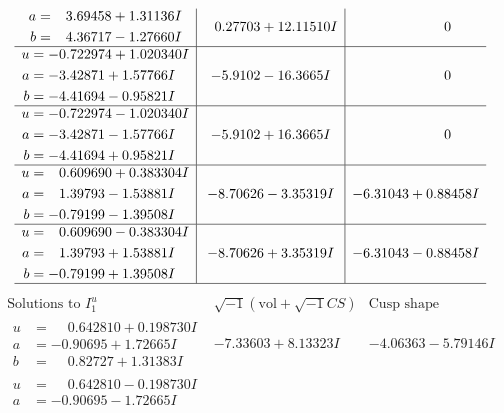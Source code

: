 \documentclass[1p]{elsarticle_modified}
\theoremstyle{definition}
\newcommand{\I}{\sqrt{-1}}
\begin{document}
$$\begin{array}{c|c|c}
\begin{aligned}
a &= \phantom{-}3.69458 + 1.31136 I \\
b &= \phantom{-}4.36717 - 1.27660 I\end{aligned}
 & \phantom{-}0.27703 + 12.11510 I & \phantom{-0.000000 } 0 \\ \hline\begin{aligned}
u &= -0.722974 + 1.020340 I \\
a &= -3.42871 + 1.57766 I \\
b &= -4.41694 - 0.95821 I\end{aligned}
 & -5.9102 - 16.3665 I & \phantom{-0.000000 } 0 \\ \hline\begin{aligned}
u &= -0.722974 - 1.020340 I \\
a &= -3.42871 - 1.57766 I \\
b &= -4.41694 + 0.95821 I\end{aligned}
 & -5.9102 + 16.3665 I & \phantom{-0.000000 } 0 \\ \hline\begin{aligned}
u &= \phantom{-}0.609690 + 0.383304 I \\
a &= \phantom{-}1.39793 - 1.53881 I \\
b &= -0.79199 - 1.39508 I\end{aligned}
 & -8.70626 - 3.35319 I & -6.31043 + 0.88458 I \\ \hline\begin{aligned}
u &= \phantom{-}0.609690 - 0.383304 I \\
a &= \phantom{-}1.39793 + 1.53881 I \\
b &= -0.79199 + 1.39508 I\end{aligned}
 & -8.70626 + 3.35319 I & -6.31043 - 0.88458 I\\
 \hline 
 \end{array}$$\newpage$$\begin{array}{c|c|c}  
\text{Solutions to }I^u_{1}& \I (\text{vol} + \sqrt{-1}CS) & \text{Cusp shape}\\
 \hline 
\begin{aligned}
u &= \phantom{-}0.642810 + 0.198730 I \\
a &= -0.90695 + 1.72665 I \\
b &= \phantom{-}0.82727 + 1.31383 I\end{aligned}
 & -7.33603 + 8.13323 I & -4.06363 - 5.79146 I \\ \hline\begin{aligned}
u &= \phantom{-}0.642810 - 0.198730 I \\
a &= -0.90695 - 1.72665 I \\

\end{aligned}
\end{array}$$
\end{document}
